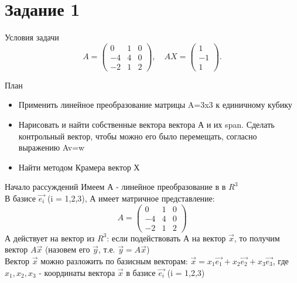 \section{Задание 1}
\plan
\begin{frame}{Условия задачи}
 \[ A = \left(\begin{array}{lll}
    0 & 1 & 0   \\
    -4 & 4 & 0  \\ 
    -2 & 1 & 2 
    \end{array}\right),\quad
    AX = \left(\begin{array}{l}
    1 \\
    -1 \\
    1   
    \end{array}\right).\]
    \begin{block}{План}
        \begin{itemize}
            \item Применить линейное преобразование матрицы A=3x3 к единичному кубику 
            \item Нарисовать и найти собственные вектора вектора А и их span. Сделать контрольный вектор, чтобы можно его было перемещать, согласно выражению Av=w
            \item Найти методом Крамера вектор Х
        \end{itemize}
    \end{block}
\end{frame}


\begin{frame}{Начало рассуждений}
Имеем А - линейное преобразование в в $R^3$\\
В базисе $\vec{e_{i}}$ (i = 1,2,3), А имеет матричное представление:
\[
A=\left(\begin{array}{lll}
    0 & 1 & 0 \\
    -4 & 4 & 0 \\
    -2 & 1 & 2
\end{array}\right)
\]
А действует на вектор из $R^3$: если подействовать А на вектор $\vec{x}$, то получим вектор $A\vec{x}$ (назовем его $\vec{y}$, т.е. $\vec{y} = A\vec{x}$) \\
Вектор $\vec{x}$ можно разложить по базисным векторам: $\vec{x} = x_{1}\vec{e_{1}} + x_{2}\vec{e_{2}} +x_{3}\vec{e_{3}}$, где $x_{1}, x_{2}, x_{3}$ - координаты вектора $\vec{x}$ в базисе $\vec{e_{i}}$ (i = 1,2,3)
\end{frame}



